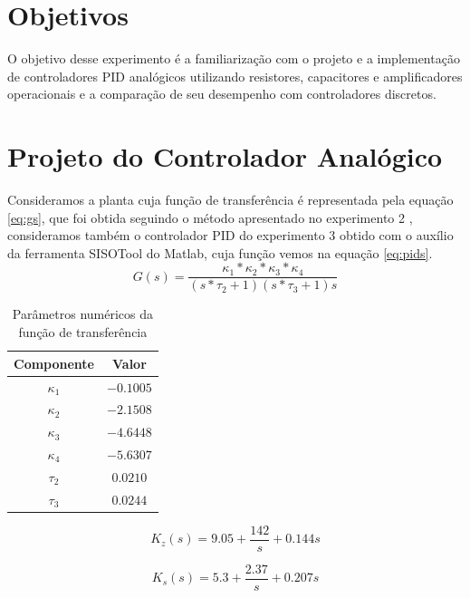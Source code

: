\documentclass{article}
\begin{document}


\onehalfspacing
\section{Objetivos} 
O objetivo desse experimento é a familiarização com o projeto e a implementação de controladores PID analógicos utilizando resistores, capacitores e amplificadores operacionais e a comparação de seu desempenho com controladores discretos. 
	
\section{Projeto do Controlador Analógico}
Consideramos a planta cuja função de transferência é representada pela equação \ref{eq:gs}, que foi obtida seguindo o método apresentado no experimento 2 \cite{bb:lab2}, consideramos também o controlador PID do experimento 3 obtido com o auxílio da ferramenta SISOTool do Matlab, cuja função vemos na equação \ref{eq:pids}.\\

\begin{equation}
\label{eq:gs}
G(s) = \frac{\kappa_1*\kappa_2*\kappa_3*\kappa_4}{(s*\tau_2 + 1)(s*\tau_3 + 1)s}
\end{equation}

\begin{table}[H]
\centering
\caption{Parâmetros numéricos da função de transferência}
\label{tab:valores}
\begin{tabular}{|c|c|}
	\hline Componente & Valor \\ 
	\hline $\kappa_1$ & $-0.1005$\\ 
	\hline $\kappa_2$ & $-2.1508$\\ 
	\hline $\kappa_3$ & $-4.6448$\\ 
	\hline $\kappa_4$ & $-5.6307$\\ 
	\hline $\tau_2$ & $0.0210$\\ 
	\hline $\tau_3$ & $0.0244$ \\ 	
	\hline 
\end{tabular} 
\end{table}

\begin{equation}
\label{eq:pidz}
K_z(s) = 9.05+\frac{142}{s}+0.144 s
\end{equation}

\begin{equation}
\label{eq:pids}
K_s(s) = 5.3+\frac{2.37}{s}+0.207 s
\end{equation}
\end{document}
